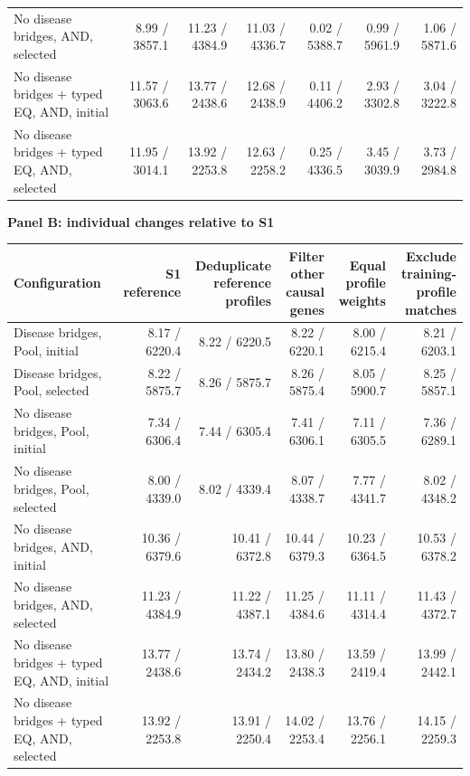 \begin{landscape}
\begin{table}[p]
\begin{adjustbox}{max width=\linewidth}
\begin{tabular}{lrrrrrr}
No disease bridges, AND, selected & 8.99 / 3857.1 & 11.23 / 4384.9 & 11.03 / 4336.7 & 0.02 / 5388.7 & 0.99 / 5961.9 & 1.06 / 5871.6 \\
No disease bridges + typed EQ, AND, initial & 11.57 / 3063.6 & 13.77 / 2438.6 & 12.68 / 2438.9 & 0.11 / 4406.2 & 2.93 / 3302.8 & 3.04 / 3222.8 \\
No disease bridges + typed EQ, AND, selected & 11.95 / 3014.1 & 13.92 / 2253.8 & 12.63 / 2258.2 & 0.25 / 4336.5 & 3.45 / 3039.9 & 3.73 / 2984.8 \\
\bottomrule
\end{tabular}
\end{adjustbox}
\par\medskip
\textbf{Panel B: individual changes relative to S1}\par\smallskip
\begin{adjustbox}{max width=\linewidth}
\begin{tabular}{lrrrrr}
\toprule
Configuration & S1 reference & \shortstack{Deduplicate\\reference profiles} & \shortstack{Filter other\\causal genes} & \shortstack{Equal profile\\weights} & \shortstack{Exclude training-\\profile matches} \\
\midrule
Disease bridges, Pool, initial & 8.17 / 6220.4 & 8.22 / 6220.5 & 8.22 / 6220.1 & 8.00 / 6215.4 & 8.21 / 6203.1 \\
Disease bridges, Pool, selected & 8.22 / 5875.7 & 8.26 / 5875.7 & 8.26 / 5875.4 & 8.05 / 5900.7 & 8.25 / 5857.1 \\
No disease bridges, Pool, initial & 7.34 / 6306.4 & 7.44 / 6305.4 & 7.41 / 6306.1 & 7.11 / 6305.5 & 7.36 / 6289.1 \\
No disease bridges, Pool, selected & 8.00 / 4339.0 & 8.02 / 4339.4 & 8.07 / 4338.7 & 7.77 / 4341.7 & 8.02 / 4348.2 \\
No disease bridges, AND, initial & 10.36 / 6379.6 & 10.41 / 6372.8 & 10.44 / 6379.3 & 10.23 / 6364.5 & 10.53 / 6378.2 \\
No disease bridges, AND, selected & 11.23 / 4384.9 & 11.22 / 4387.1 & 11.25 / 4384.6 & 11.11 / 4314.4 & 11.43 / 4372.7 \\
No disease bridges + typed EQ, AND, initial & 13.77 / 2438.6 & 13.74 / 2434.2 & 13.80 / 2438.3 & 13.59 / 2419.4 & 13.99 / 2442.1 \\
No disease bridges + typed EQ, AND, selected & 13.92 / 2253.8 & 13.91 / 2250.4 & 14.02 / 2253.4 & 13.76 / 2256.1 & 14.15 / 2259.3 \\
\bottomrule
\end{tabular}
\end{adjustbox}
\end{table}
\clearpage
\end{landscape}
